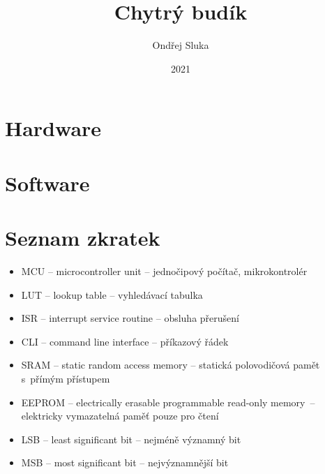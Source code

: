 \documentclass[12pt,a4paper]{article}
\title{Chytrý budík}
\author{Ondřej Sluka}
\date{2021}  %
\begin{document}
\maketitle  %

\tableofcontents



\clearpage
\section{Hardware} %
\clearpage
\section{Software}  %


\printbibliography[title={Odkazy a~literatura}]  %


\section*{Seznam zkratek}
\begin{itemize}
    \item MCU -- microcontroller unit -- jednočipový počítač, mikrokontrolér
    \item LUT -- lookup table -- vyhledávací tabulka
    \item ISR -- interrupt service routine -- obsluha přerušení
    \item CLI -- command line interface -- příkazový řádek
    \item SRAM -- static random access memory -- statická polovodičová pamět
          s~přímým přístupem
    \item EEPROM -- electrically erasable programmable read-only memory~--
          elektricky vymazatelná paměť pouze pro čtení
    \item LSB -- least significant bit -- nejméně významný bit
    \item MSB -- most significant bit -- nejvýznamnější bit
\end{itemize}
\end{document}
